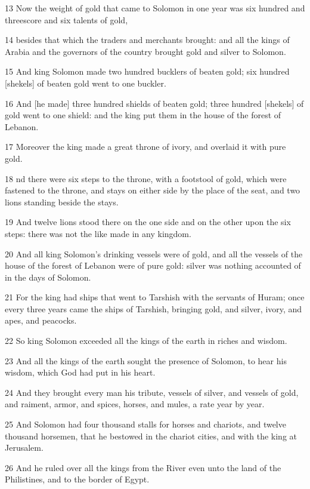\par 13 Now the weight of gold that came to Solomon in one year was six hundred and threescore and six talents of gold,
\par 14 besides that which the traders and merchants brought: and all the kings of Arabia and the governors of the country brought gold and silver to Solomon.
\par 15 And king Solomon made two hundred bucklers of beaten gold; six hundred [shekels] of beaten gold went to one buckler.
\par 16 And [he made] three hundred shields of beaten gold; three hundred [shekels] of gold went to one shield: and the king put them in the house of the forest of Lebanon.
\par 17 Moreover the king made a great throne of ivory, and overlaid it with pure gold.
\par 18 nd there were six steps to the throne, with a footstool of gold, which were fastened to the throne, and stays on either side by the place of the seat, and two lions standing beside the stays.
\par 19 And twelve lions stood there on the one side and on the other upon the six steps: there was not the like made in any kingdom.
\par 20 And all king Solomon's drinking vessels were of gold, and all the vessels of the house of the forest of Lebanon were of pure gold: silver was nothing accounted of in the days of Solomon.
\par 21 For the king had ships that went to Tarshish with the servants of Huram; once every three years came the ships of Tarshish, bringing gold, and silver, ivory, and apes, and peacocks.
\par 22 So king Solomon exceeded all the kings of the earth in riches and wisdom.
\par 23 And all the kings of the earth sought the presence of Solomon, to hear his wisdom, which God had put in his heart.
\par 24 And they brought every man his tribute, vessels of silver, and vessels of gold, and raiment, armor, and spices, horses, and mules, a rate year by year.
\par 25 And Solomon had four thousand stalls for horses and chariots, and twelve thousand horsemen, that he bestowed in the chariot cities, and with the king at Jerusalem.
\par 26 And he ruled over all the kings from the River even unto the land of the Philistines, and to the border of Egypt.
